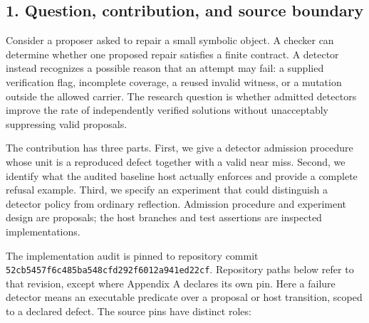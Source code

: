 \documentclass[
  11pt,
]{article}
\begin{document}
\hypertarget{question-contribution-and-source-boundary}{%
\subsection{1. Question, contribution, and source
boundary}\label{question-contribution-and-source-boundary}}

Consider a proposer asked to repair a small symbolic object. A checker
can determine whether one proposed repair satisfies a finite contract. A
detector instead recognizes a possible reason that an attempt may fail:
a supplied verification flag, incomplete coverage, a reused invalid
witness, or a mutation outside the allowed carrier. The research
question is whether admitted detectors improve the rate of independently
verified solutions without unacceptably suppressing valid proposals.

The contribution has three parts. First, we give a detector admission
procedure whose unit is a reproduced defect together with a valid near
miss. Second, we identify what the audited baseline host actually
enforces and provide a complete refusal example. Third, we specify an
experiment that could distinguish a detector policy from ordinary
reflection. Admission procedure and experiment design are proposals; the
host branches and test assertions are inspected implementations.

The implementation audit is pinned to repository commit
\texttt{\nolinkurl{52cb5457f6c485ba548cfd292f6012a941ed22cf}}.
Repository paths below refer to that revision, except where Appendix A
declares its own pin. Here a failure detector means an executable
predicate over a proposal or host transition, scoped to a declared
defect. The source pins have distinct roles:
\end{document}

